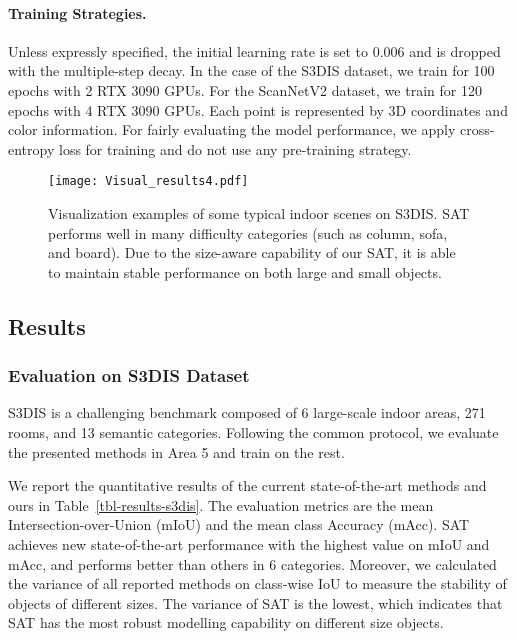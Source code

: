 \documentclass[10pt,twocolumn,letterpaper]{article}
\begin{document}
\paragraph{Training Strategies.} Unless expressly specified, the initial learning rate is set to 0.006 and is dropped with the multiple-step decay. In the case of the S3DIS dataset, we train for 100 epochs with 2 RTX 3090 GPUs. For the ScanNetV2 dataset, we train for 120 epochs with 4 RTX 3090 GPUs. Each point is represented by 3D coordinates and color information. For fairly evaluating the model performance, we apply cross-entropy loss for training and do not use any pre-training strategy.








\begin{figure*}
\centering
\texttt{[image: Visual\_results4.pdf]}
\caption{Visualization examples of some typical indoor scenes on S3DIS. SAT performs well in many difficulty categories (such as column, sofa, and board). Due to the size-aware capability of our SAT, it is able to maintain stable performance on both large and small objects.}
\label{Fig-vis-s3dis}
\end{figure*}

\subsection{Results}\label{sec-4.2}
\subsubsection{Evaluation on S3DIS Dataset}


\quad S3DIS\cite{datasets3dis} is a challenging benchmark composed of 6 large-scale indoor areas, 271 rooms, and 13 semantic categories. Following the common protocol\cite{segcloud2017}, we evaluate the presented methods in Area 5 and train on the rest.



We report the quantitative results of the current state-of-the-art methods and ours in Table~\ref{tbl-results-s3dis}. The evaluation metrics are the mean Intersection-over-Union (mIoU) and the mean class Accuracy (mAcc). SAT achieves new state-of-the-art performance with the highest value on mIoU and mAcc, and performs better than others in 6 categories. Moreover, we calculated the variance of all reported methods on class-wise IoU to measure the stability of objects of different sizes. The variance of SAT is the lowest, which indicates that SAT has the most robust modelling capability on different size objects.
\end{document}
